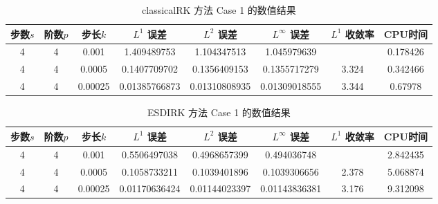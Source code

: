 \documentclass[a4paper]{article}
\begin{document}
\begin{table}[htbp]
    \centering
    \caption{classicalRK 方法 Case 1 的数值结果}
    \begin{tabular}{|c|c|c|c|c|c|c|c|}
        \hline
        步数$s$ & 阶数$p$ & 步长$k$ & $L^1$ 误差  & $L^2$ 误差 & $L^\infty$ 误差 & $L^1$ 收敛率 & CPU时间 \\
        \hline
        4 & 4 & 0.001 & 1.409489753 & 1.104347513 & 1.045979639 & ~ & 0.178426 \\ 
        4 & 4 & 0.0005 & 0.1407709702 & 0.1356409153 & 0.1355717279 & 3.324 &  0.342466\\
        4 & 4 & 0.00025 & 0.01385766873 & 0.01310808935 & 0.01309018555 & 3.344 & 0.67978 \\
        \hline
    \end{tabular}
\end{table}

\begin{table}[htbp]
    \centering
    \caption{ESDIRK 方法 Case 1 的数值结果}
    \begin{tabular}{|c|c|c|c|c|c|c|c|}
        \hline
        步数$s$ & 阶数$p$ & 步长$k$ & $L^1$ 误差  & $L^2$ 误差 & $L^\infty$ 误差 & $L^1$ 收敛率 & CPU时间 \\
        \hline
        4 & 4 & 0.001 &  0.5506497038 & 0.4968657399 & 0.494036748 & ~ & 2.842435 \\ 
        4 & 4 & 0.0005 & 0.1058733211 & 0.1039401896 & 0.1039306656 & 2.378 &  5.068874\\
        4 & 4 & 0.00025 & 0.01170636424 & 0.01144023397 &  0.01143836381 & 3.176 & 9.312098 \\
        \hline
    \end{tabular}
\end{table}
\end{document}
